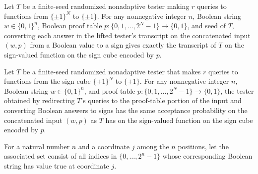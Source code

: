 \begin{theorem}
\label{FABL.boolTruthTableLiftTester_visibleTranscript}
\leanok
{}
Let $T$ be a finite-seed randomized nonadaptive tester making $r$ queries to functions
from $\{\pm1\}^N$ to $\{\pm1\}$. For any nonnegative integer $n$, Boolean string
$w\in\{0,1\}^n$, Boolean proof table $p\colon\{0,1,\ldots,2^N-1\}\to\{0,1\}$, and seed
of $T$, converting each answer in the lifted tester's transcript on the concatenated
input $(w,p)$ from a Boolean value to a sign gives exactly the transcript of $T$ on the
sign-valued function on the sign cube encoded by $p$.
\end{theorem}

\begin{theorem}
\label{FABL.boolTruthTableLiftTester_acceptanceProbability}
\leanok
{}
Let $T$ be a finite-seed randomized nonadaptive tester that makes $r$ queries to
functions from the sign cube $\{\pm1\}^N$ to $\{\pm1\}$. For any nonnegative integer
$n$, Boolean string $w\in\{0,1\}^n$, and proof table
$p\colon\{0,1,\ldots,2^N-1\}\to\{0,1\}$, the tester obtained by redirecting $T$'s
queries to the proof-table portion of the input and converting Boolean answers to signs
has the same acceptance probability on the concatenated input $(w,p)$ as $T$ has on the
sign-valued function on the sign cube encoded by $p$.
\end{theorem}

\begin{definition}
\label{FABL.coordinateTrueIndexSet}
\leanok
{}
For a natural number $n$ and a coordinate $j$ among the $n$ positions, let the
associated set consist of all indices in $\{0,\ldots,2^n-1\}$ whose corresponding Boolean
string has value true at coordinate $j$.
\end{definition}

